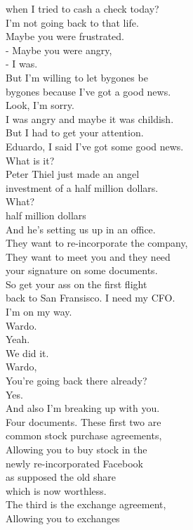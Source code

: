 \documentclass{article}
\begin{document}
\begin{multicols}{3}
when I tried to cash a check today?\\
I'm not going back to that life.\\
Maybe you were frustrated.\\
- Maybe you were angry,\\
- I was.\\
But I'm willing to let bygones be\\
bygones because I've got a good news.\\
Look, I'm sorry.\\
I was angry and maybe it was childish.\\
But I had to get your attention.\\
Eduardo, I said I've got some good news.\\
What is it?\\
Peter Thiel just made an angel\\
investment of a half million dollars.\\
What?\\
half million dollars\\
And he's setting us up in an office.\\
They want to re-incorporate the company,\\
They want to meet you and they need\\
your signature on some documents.\\
So get your ass on the first flight\\
back to San Fransisco. I need my CFO.\\
I'm on my way.\\
Wardo.\\
Yeah.\\
We did it.\\
Wardo,\\
You're going back there already?\\
Yes.\\
And also I'm breaking up with you.\\
Four documents. These first two are\\
common stock purchase agreements,\\
Allowing you to buy stock in the\\
newly re-incorporated Facebook\\
as supposed the old share\\
which is now worthless.\\
The third is the exchange agreement,\\
Allowing you to exchanges\\

\end{multicols}
\end{document}
